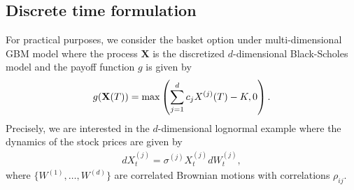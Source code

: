 \subsection{Discrete time formulation}\label{sec:Discrete time, practical motivation}
For practical purposes, we consider the basket option under multi-dimensional GBM model where the process $\mathbf{X}$ is the discretized $d$-dimensional Black-Scholes model and the payoff function $g$ is given by
\begin{align}
	g(\mathbf{X}(T))=\max\left(\sum_{j=1}^{d} c_{j} X^{(j)}(T)-K,0  \right)	.
\end{align}
Precisely, we are interested in the  $d$-dimensional lognormal example where the dynamics of the stock prices are given by
\begin{align}\label{lognormal_dynamics_basket}
	dX^{(j)}_t=\sigma^{(j)} X^{(j)}_t dW^{(j)}_t,
\end{align}
where $\{W^{(1)}, \dots,W^{(d)}\}$ are correlated Brownian motions with correlations $\rho_{ij}$.


